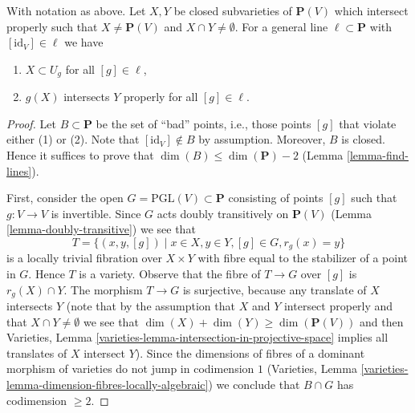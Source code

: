 \begin{lemma}
\label{lemma-make-family}
With notation as above. Let $X, Y$ be closed subvarieties of $\mathbf{P}(V)$
which intersect properly such that $X \not = \mathbf{P}(V)$ and
$X \cap Y \not = \emptyset$. For a general line $\ell \subset \mathbf{P}$
with $[\text{id}_V] \in \ell$ we have
\begin{enumerate}
\item $X \subset U_g$ for all $[g] \in \ell$,
\item $g(X)$ intersects $Y$ properly for all $[g] \in \ell$.
\end{enumerate}
\end{lemma}

\begin{proof}
Let $B \subset \mathbf{P}$ be the set of ``bad'' points, i.e., those
points $[g]$ that violate either (1) or (2). Note that
$[\text{id}_V] \not \in B$ by assumption. Moreover, $B$ is closed.
Hence it suffices to prove that $\dim(B) \leq \dim(\mathbf{P}) - 2$
(Lemma \ref{lemma-find-lines}).

\medskip\noindent
First, consider the open $G = \text{PGL}(V) \subset \mathbf{P}$
consisting of points $[g]$ such that $g : V \to V$ is invertible.
Since $G$ acts doubly transitively on $\mathbf{P}(V)$
(Lemma \ref{lemma-doubly-transitive})
we see that
$$
T = \{(x, y, [g]) \mid x \in X, y \in Y, [g] \in G, r_g(x) = y\}
$$
is a locally trivial fibration over $X \times Y$ with fibre equal
to the stabilizer of a point in $G$. Hence $T$ is a variety.
Observe that the fibre of $T \to G$ over $[g]$ is $r_g(X) \cap Y$.
The morphism $T \to G$ is surjective, because any translate of $X$
intersects $Y$ (note that by the assumption that $X$ and $Y$ intersect
properly and that $X \cap Y \not = \emptyset$ we see that
$\dim(X) + \dim(Y) \geq \dim(\mathbf{P}(V))$ and then
Varieties, Lemma \ref{varieties-lemma-intersection-in-projective-space}
implies all translates of $X$ intersect $Y$).
Since the dimensions of fibres of a dominant morphism of varieties do
not jump in codimension $1$
(Varieties, Lemma \ref{varieties-lemma-dimension-fibres-locally-algebraic})
we conclude that $B \cap G$ has codimension $\geq 2$.


\end{proof}
